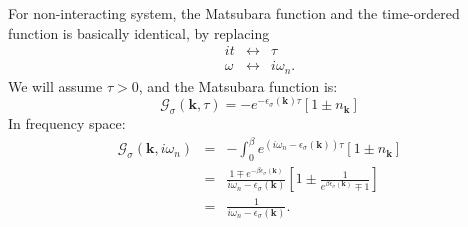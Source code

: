 \documentclass[journal=jacsat,manuscript=article]{achemso}
\begin{document}
For non-interacting system, the Matsubara function and the time-ordered
function is basically identical, by replacing
\begin{eqnarray}
	it & \leftrightarrow & \tau\\
	\omega & \leftrightarrow & i\omega_{n}.
\end{eqnarray}
We will assume $\tau>0$, and the Matsubara function is:
\begin{equation}
	\mathcal{G}_{\sigma}\left(\bm{k},\tau\right)=-e^{-\epsilon_{\sigma}\left(\bm{k}\right)\tau}\left[1\pm n_{\bm{k}}\right]
	\end{equation}
In frequency space:
\begin{eqnarray}
	\mathcal{G}_{\sigma}\left(\bm{k},i\omega_{n}\right)\nonumber
 	& = & -\int_{0}^{\beta}e^{\left(i\omega_{n}-\epsilon_{\sigma}\left(\bm{k}\right)\right)\tau}\left[1\pm n_{\bm{k}}\right]\nonumber \\
 	& = & \frac{1\mp e^{-\beta\epsilon_{\sigma}\left(\bm{k}\right)}}{i\omega_{n}-\epsilon_{\sigma}\left(\bm{k}\right)}\left[1\pm\frac{1}{e^{\beta\epsilon_{\sigma}\left(\bm{k}\right)}\mp1}\right]\nonumber \\
 	& = & \frac{1}{i\omega_{n}-\epsilon_{\sigma}\left(\bm{k}\right)}.
\end{eqnarray}
\end{document}
